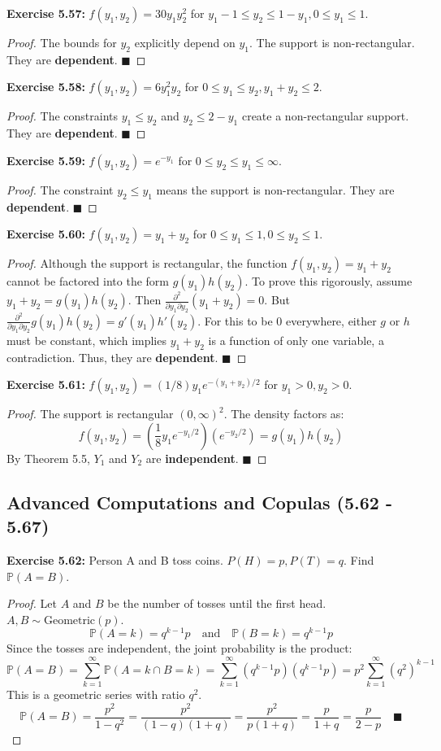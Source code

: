 \documentclass[11pt, a4paper]{article}
\theoremstyle{definition}
\theoremstyle{remark}
\newcommand{\Prob}{\mathbb{P}}
\begin{document}
\textbf{Exercise 5.57:} $f(y_1, y_2) = 30y_1 y_2^2$ for $y_1-1 \le y_2 \le 1-y_1, 0 \le y_1 \le 1$.
\begin{proof}
The bounds for $y_2$ explicitly depend on $y_1$. The support is non-rectangular. They are \textbf{dependent}. $\blacksquare$
\end{proof}

\textbf{Exercise 5.58:} $f(y_1, y_2) = 6y_1^2 y_2$ for $0 \le y_1 \le y_2, y_1+y_2 \le 2$.
\begin{proof}
The constraints $y_1 \le y_2$ and $y_2 \le 2 - y_1$ create a non-rectangular support. They are \textbf{dependent}. $\blacksquare$
\end{proof}

\textbf{Exercise 5.59:} $f(y_1, y_2) = e^{-y_1}$ for $0 \le y_2 \le y_1 \le \infty$.
\begin{proof}
The constraint $y_2 \le y_1$ means the support is non-rectangular. They are \textbf{dependent}. $\blacksquare$
\end{proof}

\textbf{Exercise 5.60:} $f(y_1, y_2) = y_1 + y_2$ for $0 \le y_1 \le 1, 0 \le y_2 \le 1$.
\begin{proof}
Although the support is rectangular, the function $f(y_1, y_2) = y_1 + y_2$ cannot be factored into the form $g(y_1)h(y_2)$. To prove this rigorously, assume $y_1+y_2 = g(y_1)h(y_2)$. Then $\frac{\partial^2}{\partial y_1 \partial y_2} (y_1+y_2) = 0$. But $\frac{\partial^2}{\partial y_1 \partial y_2} g(y_1)h(y_2) = g'(y_1)h'(y_2)$. For this to be 0 everywhere, either $g$ or $h$ must be constant, which implies $y_1+y_2$ is a function of only one variable, a contradiction. Thus, they are \textbf{dependent}. $\blacksquare$
\end{proof}

\textbf{Exercise 5.61:} $f(y_1, y_2) = (1/8)y_1 e^{-(y_1+y_2)/2}$ for $y_1 > 0, y_2 > 0$.
\begin{proof}
The support is rectangular $(0, \infty)^2$. The density factors as:
\[ f(y_1, y_2) = \left( \frac{1}{8} y_1 e^{-y_1/2} \right) \left( e^{-y_2/2} \right) = g(y_1)h(y_2) \]
By Theorem 5.5, $Y_1$ and $Y_2$ are \textbf{independent}. $\blacksquare$
\end{proof}

\subsection{Advanced Computations and Copulas (5.62 - 5.67)}

\textbf{Exercise 5.62:} Person A and B toss coins. $P(H)=p, P(T)=q$. Find $\Prob(A = B)$.
\begin{proof}
Let $A$ and $B$ be the number of tosses until the first head. $A, B \sim \text{Geometric}(p)$.
\[ \Prob(A = k) = q^{k-1}p \quad \text{and} \quad \Prob(B = k) = q^{k-1}p \]
Since the tosses are independent, the joint probability is the product:
\[ \Prob(A = B) = \sum_{k=1}^{\infty} \Prob(A = k \cap B = k) = \sum_{k=1}^{\infty} (q^{k-1}p)(q^{k-1}p) = p^2 \sum_{k=1}^{\infty} (q^2)^{k-1} \]
This is a geometric series with ratio $q^2$.
\[ \Prob(A = B) = \frac{p^2}{1 - q^2} = \frac{p^2}{(1-q)(1+q)} = \frac{p^2}{p(1+q)} = \frac{p}{1+q} = \frac{p}{2-p} \quad \blacksquare \]
\end{proof}
\end{document}
